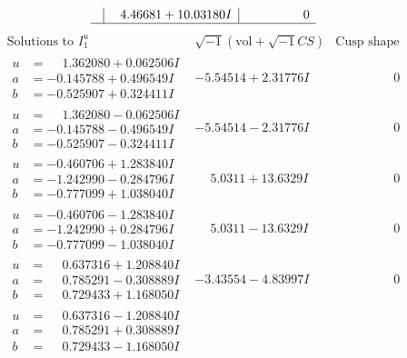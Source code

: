 \documentclass[1p]{elsarticle_modified}
\theoremstyle{definition}
\newcommand{\I}{\sqrt{-1}}
\begin{document}
$$\begin{array}{c|c|c}
 & \phantom{-}4.46681 + 10.03180 I & \phantom{-0.000000 } 0\\
 \hline 
 \end{array}$$\newpage$$\begin{array}{c|c|c}  
\text{Solutions to }I^u_{1}& \I (\text{vol} + \sqrt{-1}CS) & \text{Cusp shape}\\
 \hline 
\begin{aligned}
u &= \phantom{-}1.362080 + 0.062506 I \\
a &= -0.145788 + 0.496549 I \\
b &= -0.525907 + 0.324411 I\end{aligned}
 & -5.54514 + 2.31776 I & \phantom{-0.000000 } 0 \\ \hline\begin{aligned}
u &= \phantom{-}1.362080 - 0.062506 I \\
a &= -0.145788 - 0.496549 I \\
b &= -0.525907 - 0.324411 I\end{aligned}
 & -5.54514 - 2.31776 I & \phantom{-0.000000 } 0 \\ \hline\begin{aligned}
u &= -0.460706 + 1.283840 I \\
a &= -1.242990 - 0.284796 I \\
b &= -0.777099 + 1.038040 I\end{aligned}
 & \phantom{-}5.0311 + 13.6329 I & \phantom{-0.000000 } 0 \\ \hline\begin{aligned}
u &= -0.460706 - 1.283840 I \\
a &= -1.242990 + 0.284796 I \\
b &= -0.777099 - 1.038040 I\end{aligned}
 & \phantom{-}5.0311 - 13.6329 I & \phantom{-0.000000 } 0 \\ \hline\begin{aligned}
u &= \phantom{-}0.637316 + 1.208840 I \\
a &= \phantom{-}0.785291 - 0.308889 I \\
b &= \phantom{-}0.729433 + 1.168050 I\end{aligned}
 & -3.43554 - 4.83997 I & \phantom{-0.000000 } 0 \\ \hline\begin{aligned}
u &= \phantom{-}0.637316 - 1.208840 I \\
a &= \phantom{-}0.785291 + 0.308889 I \\
b &= \phantom{-}0.729433 - 1.168050 I\end{aligned}

\end{array}$$
\end{document}
